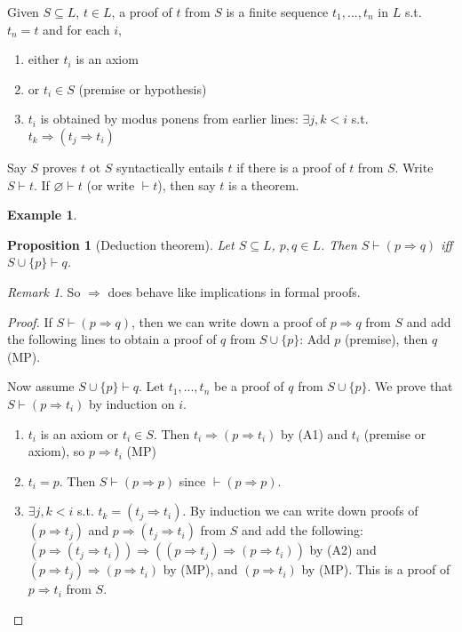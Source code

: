 \documentclass{article}
\theoremstyle{definition}
\newtheorem{example}[defn]{Example}
\theoremstyle{remark}
\newtheorem{rem}{Remark}
\theoremstyle{plain}
\newtheorem{prop}[defn]{Proposition}
\begin{document}
Given $S\subseteq L$, $t\in L$, a proof of $t$ from $S$ is a finite sequence $t_1,...,t_n$ in $L$ s.t. $t_n=t$ and for each $i$, 
\begin{enumerate}
    \item[(i)] either $t_i$ is an axiom 
    \item[(ii)] or $t_i\in S$ (premise or hypothesis)
    \item[(iii)] $t_i$ is obtained by modus ponens from earlier lines: $\exists j,k<i$ s.t. $t_k\Rightarrow (t_j\Rightarrow t_i)$
\end{enumerate}
Say $S$ proves $t$ ot $S$ syntactically entails $t$ if there is a proof of $t$ from $S$. Write $S\vdash t$.
If $\varnothing\vdash t$ (or write $\vdash t$), then say $t$ is a theorem.
\begin{example}
    
\end{example}
\begin{prop}[Deduction theorem]
    Let $S\subseteq L$, $p,q\in L$. Then $S\vdash (p\Rightarrow q)$ iff $S\cup \{p\}\vdash q$.
\end{prop}
\begin{rem}
    So $\Rightarrow$ does behave like implications in formal proofs.
\end{rem}
\begin{proof}
    If $S\vdash (p\Rightarrow q)$, then we can write down a proof of $p\Rightarrow q$ from $S$ and add the following lines to obtain a proof of $q$ from $S\cup\{p\}$: Add $p$ (premise), then $q$ (MP).

    Now assume $S\cup\{p\}\vdash q$. Let $t_1,...,t_n$ be a proof of $q$ from $S\cup\{p\}$. We prove that $S\vdash (p\Rightarrow t_i)$ by induction on $i$.
    \begin{enumerate}
        \item[Case 1.] $t_i$ is an axiom or $t_i\in S$. Then $t_i\Rightarrow(p\Rightarrow t_i)$ by (A1) and $t_i$ (premise or axiom), so $p\Rightarrow t_i$ (MP)
        \item[Case 2.] $t_i=p$. Then $S\vdash (p\Rightarrow p)$ since $\vdash (p\Rightarrow p)$.
        \item[Case 3.] $\exists j,k<i$ s.t. $t_k=(t_j\Rightarrow t_i)$. By induction we can write down proofs of $(p\Rightarrow t_j)$ and $p\Rightarrow (t_j\Rightarrow t_i)$ from $S$ and add the following: $(p\Rightarrow (t_j\Rightarrow t_i))\Rightarrow((p\Rightarrow t_j)\Rightarrow(p\Rightarrow t_i))$ by (A2) and $(p\Rightarrow t_j)\Rightarrow(p\Rightarrow t_i)$ by (MP), and $(p\Rightarrow t_i)$ by (MP). This is a proof of $p\Rightarrow t_i$ from $S$.
    \end{enumerate}
\end{proof}
\end{document}
